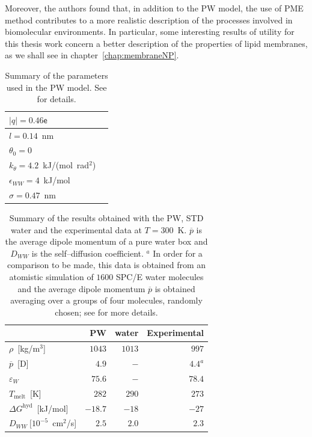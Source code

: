 Moreover, the authors found that, in addition to the \ac{PW} model, the use of \ac{PME} method contributes to a
more realistic description of the processes involved in biomolecular environments. In particular, some
interesting results of utility for this thesis work concern a better description of the properties of lipid
membranes, as we shall see in chapter~\ref{chap:membraneNP}.

\begin{table}
	\centering
	\begin{tabular}{ll}
		\toprule
		$|q| = 0.46\mathsf{e}$				\\ \midrule
		$l = 0.14$~nm						\\ \midrule
		$\theta_0 = 0$						\\ \midrule
		$k_\theta = 4.2$~kJ/(mol\ rad$^2$)	\\ \midrule
		$\epsilon_{WW} = 4$~kJ/mol			\\ \midrule
		$\sigma = 0.47$~nm					\\ \bottomrule
	\end{tabular}
	\caption{Summary of the parameters used in the \acs{PW} model. See \cite{PW} for details.}
	\label{tab:PWParam}
\end{table}

\begin{table}
	\centering
	\begin{tabular}{lrrr}
		\toprule
		\,	& \acs{PW} &  \martini{} water & Experimental \\ \toprule
		$\rho$~[kg/m$^3$]				& $1043$  & $1013$  & $997$		\\ \midrule
		$\overline{p}$~[D] 				& $4.9$   & $-$ 	& $4.4^a$		\\ \midrule
		$\varepsilon_{W}$ 				& $75.6$  & $-$ 	& $78.4$	\\ \midrule
		$T_\text{melt}$~[K] 			& $282$   & $290$ 	& $273$		\\ \midrule
		$\Delta G^\text{hyd}$~[kJ/mol] 	& $-18.7$ &	$-18$	& $-27$		\\ \midrule%
		$D_{WW}~[10^{-5}$~cm$^2$/s]		& $2.5$   & $2.0$   & $2.3$		\\ \bottomrule
	\end{tabular}
	\caption{Summary of the results obtained with the \acs{PW}, \acs{STD} \martini{} water and the experimental data at $T=300$~K. $\overline{p}$ is the average dipole momentum of a pure water box and $D_{WW}$ is the self--diffusion coefficient. $^a$ In order for a comparison to be made, this data is obtained from an atomistic simulation of $1600$ SPC/E water molecules and the average dipole momentum $\overline{p}$ is obtained averaging over a groups of four molecules, randomly chosen; see \cite{PW} for more details.}%
	\label{tab:PWRes}
\end{table}

